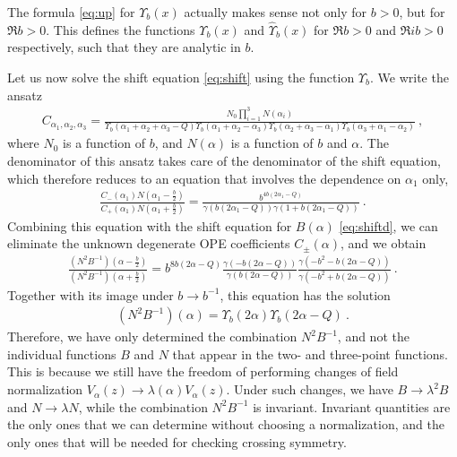 \documentclass[12pt, a4paper]{article}
\theoremstyle{break}
\begin{document}
The formula \eqref{eq:up} for $\Upsilon_b(x)$ actually makes sense not only for $b>0$, but for $\Re b>0$. This defines the functions $\Upsilon_b(x)$ and $\hat\Upsilon_b(x)$  for $\Re b>0$ and $\Re ib>0$ respectively, such that they are analytic in $b$. 

Let us now solve the shift equation \eqref{eq:shift} using the function $\Upsilon_b$. We write the ansatz
\begin{align}
 C_{\alpha_1,\alpha_2,\alpha_3} =  \frac{N_0 \prod_{i=1}^3 N(\alpha_i)}{\Upsilon_b(\alpha_1+\alpha_2+\alpha_3-Q) \Upsilon_b(\alpha_1+\alpha_2-\alpha_3)\Upsilon_b(\alpha_2+\alpha_3-\alpha_1)\Upsilon_b(\alpha_3+\alpha_1-\alpha_2)} \ ,
\end{align}
where $N_0$ is a function of $b$, and $N(\alpha)$ is a function of $b$ and $\alpha$. 
The denominator of this ansatz takes care of the denominator of the shift equation, which therefore reduces to an equation that involves the dependence on $\alpha_1$ only, 
\begin{align}
 \frac{C_-(\alpha_1)N(\alpha_1-\frac{b}{2})}{C_+(\alpha_1)N(\alpha_1+\frac{b}{2})} = \frac{b^{4b(2\alpha_1-Q)}}{ \gamma(b(2\alpha_1-Q)) \gamma(1+b(2\alpha_1-Q))}\ .
\end{align}
Combining this equation with the shift equation for $B(\alpha)$ \eqref{eq:shiftd}, we can eliminate the unknown degenerate OPE coefficients $C_\pm(\alpha)$, and we obtain
\begin{align}
 \frac{\left(N^2B^{-1}\right)(\alpha-\frac{b}{2})}{\left(N^2B^{-1}\right)(\alpha+\frac{b}{2})} = b^{8b(2\alpha-Q)} \frac{\gamma(-b(2\alpha-Q))}{\gamma(b(2\alpha-Q))} \frac{\gamma(-b^2-b(2\alpha-Q))}{\gamma(-b^2+b(2\alpha-Q))}\ .
\end{align}
Together with its image under $b\to b^{-1}$, this equation has the solution
\begin{align}
 \left(N^2B^{-1}\right)(\alpha) = \Upsilon_b(2\alpha)\Upsilon_b(2\alpha-Q)\ .
 \label{eq:ntbm}
\end{align}
Therefore, we have only determined the combination $N^2B^{-1}$, and not the individual functions $B$ and $N$ that appear in the 
two- and three-point functions. This is because we still have the freedom of performing changes of field normalization $V_\alpha(z) \to \lambda(\alpha)V_\alpha(z)$. Under such changes, we have $B\to \lambda^2B$ and $N\to \lambda N$, while
the combination $N^2B^{-1}$ is invariant. Invariant quantities are the only ones that we can determine without choosing a normalization, and the only ones that will be needed for checking crossing symmetry. 
\end{document}
